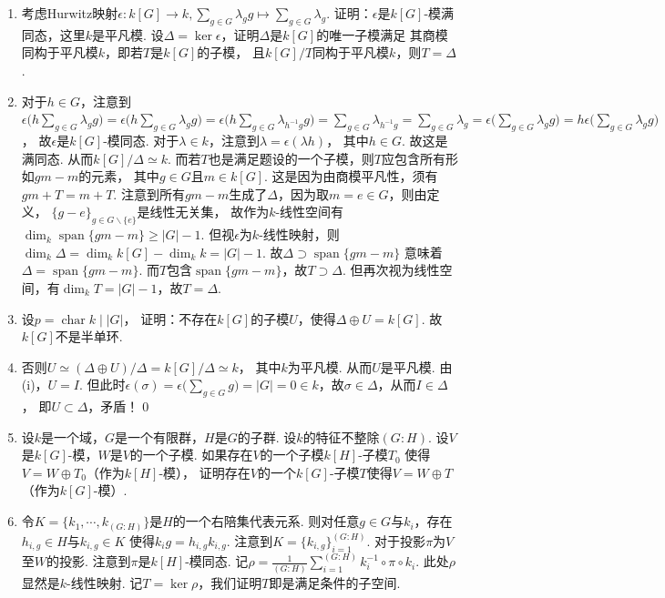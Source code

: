 \begin{enumerate}
\item[(ii)] 
    考虑Hurwitz映射$\epsilon:k[G] \rightarrow k,
    \sum\limits_{g \in G} \lambda_{g}g \mapsto 
    \sum\limits_{g \in G}\lambda_{g}$.
    证明：$\epsilon$是$k[G]$-模满同态，这里$k$是平凡模. 
    设$\Delta = \ker \epsilon$，证明$\Delta$是$k[G]$的唯一子模满足
    其商模同构于平凡模$k$，即若$T$是$k[G]$的子模，
    且$k[G]/T$同构于平凡模$k$，则$T = \Delta$.
\item[\textbf{证明:}]
    对于$h \in G$，注意到$\epsilon\big(h\sum\limits_{g \in G}\lambda_{g}g\big) 
    = \epsilon\big(h\sum\limits_{g \in G}\lambda_{g}g\big)
    = \epsilon\big(h\sum\limits_{g \in G}\lambda_{h^{-1}g}g\big)
    = \sum\limits_{g \in G}\lambda_{h^{-1}g} = \sum\limits_{g \in G}\lambda_{g}
    = \epsilon\big(\sum\limits_{g \in G}\lambda_{g}g\big) 
    = h\epsilon\big(\sum\limits_{g \in G}\lambda_{g}g\big)$，
    故$\epsilon$是$k[G]$-模同态.
    对于$\lambda \in k$，注意到$\lambda = \epsilon(\lambda h)$，
    其中$h \in G$. 故这是满同态. 从而$k[G]/\Delta \simeq k$.
    而若$T$也是满足题设的一个子模，则$T$应包含所有形如$gm-m$的元素，
    其中$g \in G$且$m \in k[G]$. 这是因为由商模平凡性，须有$gm + T = m + T$.
    注意到所有$gm-m$生成了$\Delta$，因为取$m=e \in G$，则由定义，
    $\{g-e\}_{g \in G \backslash \{e\}}$是线性无关集，
    故作为$k$-线性空间有$\dim_{k} \operatorname{span} \{gm-m\} \geq |G|-1$.
    但视$\epsilon$为$k$-线性映射，则
    $\dim_{k} \Delta = \dim_{k} k[G] - \dim_{k}k = |G|-1$.
    故$\Delta \supset \operatorname{span}\{gm-m\}$
    意味着$\Delta = \operatorname{span}\{gm-m\}$. 
    而$T$包含$\operatorname{span}\{gm-m\}$，故$T \supset \Delta$. 
    但再次视为线性空间，有$\dim_{k}T = |G|-1$，故$T=\Delta$. 
\item[(iii)] 设$p = \operatorname{char} k \mid |G|$，
    证明：不存在$k[G]$的子模$U$，使得$\Delta \oplus U = k[G]$. 
    故$k[G]$不是半单环.
\item[\textbf{证明:}]
    否则$U \simeq (\Delta \oplus U)/\Delta = k[G]/\Delta \simeq k$，
    其中$k$为平凡模. 从而$U$是平凡模. 由(i)，$U = I$.
    但此时$\epsilon(\sigma) = \epsilon\big(\sum\limits_{g \in G}g\big) 
    = |G| = 0 \in k$，故$\sigma \in \Delta$，从而$I \in \Delta$，
    即$U \subset \Delta$，矛盾！\qed

\item[9.8] 设$k$是一个域，$G$是一个有限群，$H$是$G$的子群. 
    设$k$的特征不整除$(G:H)$. 
    设$V$是$k[G]$-模，$W$是$V$的一个子模.
    如果存在$V$的一个子模$k[H]$-子模$T_{0}$
    使得$V = W \oplus T_{0}$（作为$k[H]$-模），
    证明存在$V$的一个$k[G]$-子模$T$使得$V=W \oplus T$（作为$k[G]$-模）.
\item[\textbf{证明:}]
    令$K=\{k_{1},\cdots,k_{(G:H)}\}$是$H$的一个右陪集代表元系. 
    则对任意$g \in G$与$k_{i}$，存在$h_{i,g} \in H$与$k_{i,g} \in K$
    使得$k_{i}g = h_{i,g}k_{i,g}$. 注意到$K=\{k_{i,g}\}_{i=1}^{(G:H)}$.
    对于投影$\pi$为$V$至$W$的投影. 注意到$\pi$是$k[H]$-模同态.
    记$\rho = \frac{1}{(G:H)}\sum\limits_{i=1}^{(G:H)}k_{i}^{-1} \circ \pi \circ k_{i}$.
    此处$\rho$显然是$k$-线性映射. 记$T = \ker \rho$，我们证明$T$即是满足条件的子空间.
        

\end{enumerate}
